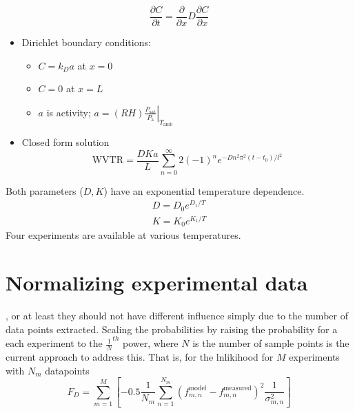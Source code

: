 \documentclass{tufte-handout}
\begin{document}
\begin{equation} \frac{\partial C}{\partial t} =
    \frac{\partial}{\partial x} D \frac{\partial C}{\partial x}
\end{equation}

\begin{itemize}
  \item Dirichlet boundary conditions:
      \begin{itemize}
          \item $C=k_Da$ at $x=0$
          \item $C=0$ at $x=L$
          \item $a$ is activity; $a = (RH)\left.\frac{P_{\mathrm{sat}}}{P_{\mathrm{a}}}\right|_{T_\mathrm{amb}}$
        \end{itemize}
   \item Closed form solution 
       \begin{equation}
           \mathrm{WVTR} = \frac{DKa}{L}\sum_{n=0}^{\infty} 2(-1)^ne^{-Dn^2\pi^2(t-t_0)/l^2}
       \end{equation}
\end{itemize}

Both parameters ($D,K$) have an exponential temperature dependence.
\begin{gather}
        D = D_0 e^{D_1/T}\\
        K = K_0 e^{K_1/T}
\end{gather}
Four experiments are available at various temperatures. 

\section{Normalizing experimental data}
, or at least they
should not have different influence simply due to the number of data points
extracted. Scaling the probabilities by raising the probability for a each
experiment to the $\frac{1}{N}^{th}$ power, where $N$ is the number of sample
points is the current approach to address this. That is, for the lnlikihood for
$M$ experiments with $N_m$ datapoints
\begin{equation}
    F_D = \sum_{m=1}^{M} \left[ -0.5\frac{1}{N_m} \sum_{n=1}^{N_m} (f_{m,n}^{\mathrm{model}} - f_{m,n}^{\mathrm{measured}})^2 \frac{1}{\sigma_{m,n}^2} \right]
    \label{eq:FD}
\end{equation}
\end{document}
